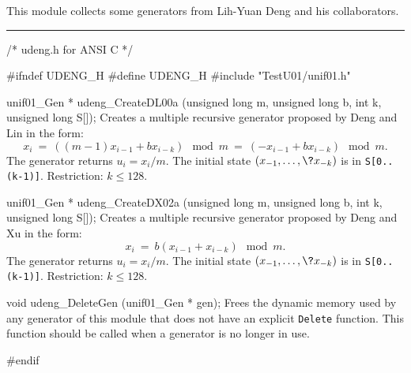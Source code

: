 
This module collects some generators from Lih-Yuan Deng and his
 collaborators.%



\bigskip
\hrule
\code\hide
/* udeng.h for ANSI C */

#ifndef UDENG_H
#define UDENG_H
\endhide
#include "TestU01/unif01.h"
\endcode
\code


unif01_Gen * udeng_CreateDL00a (unsigned long m, unsigned long b, int k,
                                unsigned long S[]);
\endcode
  \tab Creates a multiple recursive generator proposed by Deng
   and Lin \cite{rDEN00a} in the form:
   $$
     x_i\ =\ ((m-1)x_{i-1} + b x_{i-k}) \mod m\ =\ 
           (-x_{i-1} + b x_{i-k}) \mod m.
   $$
   The generator returns $u_i = x_i/m$. The initial state 
   $(x_{-1},\dots,\?x_{-k})$ is in {\tt S[0..(k-1)]}.
   Restriction: $k \le 128$.
 \endtab
\code


unif01_Gen * udeng_CreateDX02a (unsigned long m, unsigned long b, int k,
                                unsigned long S[]);
\endcode
  \tab Creates a multiple recursive generator proposed by Deng
   and Xu \cite{rDEN02a} in the form:
   $$
     x_i \ =\ b(x_{i-1} + x_{i-k}) \mod m.
   $$
   The generator returns $u_i = x_i/m$. The initial state 
   $(x_{-1},\dots,\?x_{-k})$ is in {\tt S[0..(k-1)]}.
   Restriction: $k \le 128$.
 \endtab






\code


void udeng_DeleteGen (unif01_Gen * gen);
\endcode
  \tab Frees the dynamic memory used by any generator of this module
  that does not have an explicit {\tt Delete} function. 
  This function should be called when a generator
  is no longer in use.
 \endtab

\code
\hide
#endif
\endhide
\endcode
